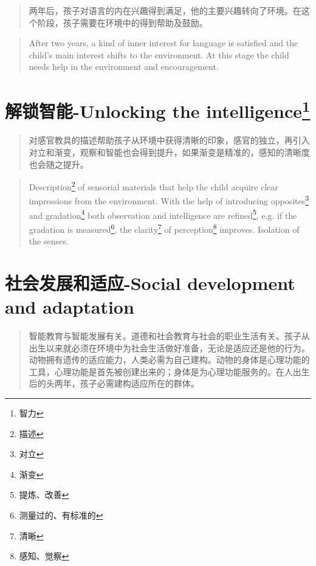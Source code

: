 \documentclass[lang=cn,10pt]{elegantbook}
\begin{document}
\begin{quote}
{\small 两年后，孩子对语言的内在兴趣得到满足，他的主要兴趣转向了环境。在这个阶段，孩子需要在环境中的得到帮助及鼓励。}
\end{quote}

\begin{tcolorbox}
\begin{quote}
{\small After two years, a kind of inner interest for language is satisfied and the child's main interest shifts to the environment. At this stage the child needs help in the environment and encouragement.}
\end{quote}
\end{tcolorbox}

\chapter{解锁智能-Unlocking the intelligence\footnote{智力}}

\begin{quote}
{\small 对感官教具的描述帮助孩子从环境中获得清晰的印象，感官的独立，再引入对立和渐变，观察和智能也会得到提升，如果渐变是精准的，感知的清晰度也会随之提升。}
\end{quote}

\begin{tcolorbox}
\begin{quote}
{\small Description\footnote{描述} of sensorial materials that help the child acquire clear impressions from the environment. With the help of introducing opposites\footnote{对立} and gradation\footnote{渐变} both observation and intelligence are refined\footnote{提炼、改善}, e.g. if the gradation is measured\footnote{测量过的、有标准的}, the clarity\footnote{清晰} of perception\footnote{感知、觉察} improves. Isolation of the senses.}
\end{quote}
\end{tcolorbox}

\chapter{社会发展和适应-Social development and adaptation}

\begin{quote}
{\small 智能教育与智能发展有关。道德和社会教育与社会的职业生活有关。孩子从出生以来就必须在环境中为社会生活做好准备，无论是适应还是他的行为。动物拥有遗传的适应能力，人类必需为自己建构。动物的身体是心理功能的工具，心理功能是首先被创建出来的；身体是为心理功能服务的。在人出生后的头两年，孩子必需建构适应所在的群体。}
\end{quote}
\end{document}
